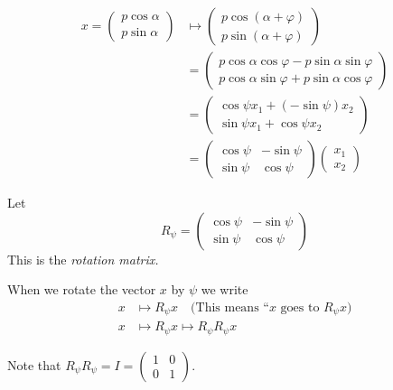 \documentclass[10pt]{scrartcl}
\begin{document}
 \begin{align*}
 x = \begin{pmatrix}
 p \cos\alpha\\ p \sin\alpha 	
 \end{pmatrix} &\longmapsto  \begin{pmatrix}
 p\cos(\alpha + \varphi)\\ p\sin(\alpha +\varphi)	
 \end{pmatrix}\\
 &= \begin{pmatrix}
 p\cos\alpha\cos\varphi - p\sin\alpha\sin\varphi\\
 p\cos\alpha\sin\varphi + p\sin\alpha\cos\varphi 	
 \end{pmatrix}\\
 &= \begin{pmatrix}
 \cos\psi x_1 + (-\sin\psi)x_2\\
 \sin\psi x_1 + \cos\psi x_2	
 \end{pmatrix}\\
 &= \begin{pmatrix}
 \cos\psi & -\sin \psi\\
 \sin\psi & \cos\psi 	
 \end{pmatrix}
 \begin{pmatrix}
x_1\\x_2	
\end{pmatrix}
\end{align*}


\begin{definition}
Let \[
  R_{\psi} = \begin{pmatrix}
 \cos\psi & -\sin\psi\\
 \sin\psi & \cos\psi 	
 \end{pmatrix}
\]
This is the \emph{rotation matrix.} 
\end{definition}

When we rotate the vector $x$ by $\psi$ we write
\begin{align*}
  x &\longmapsto R_\psi x \quad \mbox{(This means ``$x$ goes to $R_\psi x$)}\\
  x &\longmapsto R_\psi x \longmapsto R_\psi R_\psi x 
\end{align*}

Note that $R_{\psi}R_{\psi} = I = \begin{pmatrix}
 1 & 0 \\ 0 & 1	
 \end{pmatrix}$. 

\begin{center}
\end{center}
\end{document}
